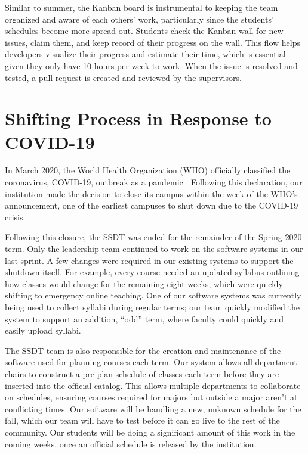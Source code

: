 Similar to summer, the Kanban board is instrumental to keeping the team organized and aware of each others' work, particularly since the students' schedules become more spread out. Students check the Kanban wall for new issues, claim them, and keep record of their progress on the wall. This flow helps developers visualize their progress and estimate their time, which is essential given they only have 10 hours per week to work. When the issue is resolved and tested, a pull request is created and reviewed by the supervisors.


\section{Shifting Process in Response to COVID-19}
In March 2020, the World Health Organization (WHO) officially classified the coronavirus, COVID-19, outbreak as a pandemic \cite{covid}. Following this declaration, our institution made the decision to close its campus within the week of the WHO’s announcement, one of the earliest campuses to shut down due to the COVID-19 crisis.

Following this closure, the SSDT was ended for the remainder of the Spring 2020 term. Only the leadership team continued to work on the software systems in our last sprint. A few changes were required in our existing systems to support the shutdown itself. For example, every course needed an updated syllabus outlining how classes would change for the remaining eight weeks, which were quickly shifting to emergency online teaching. One of our software systems was currently being used to collect syllabi during regular terms; our team quickly modified the system to support an addition, ``odd'' term, where faculty could quickly and easily upload syllabi.

The SSDT team is also responsible for the creation and maintenance of the software used for planning courses each term. Our system allows all department chairs to construct a pre-plan schedule of classes each term before they are inserted into the official catalog. This allows multiple departments to collaborate on schedules, ensuring courses required for majors but outside a major aren't at conflicting times. Our software will be handling a new, unknown schedule for the fall, which our team will have to test before it can go live to the rest of the community. Our students will be doing a significant amount of this work in the coming weeks, once an official schedule is released by the institution.

